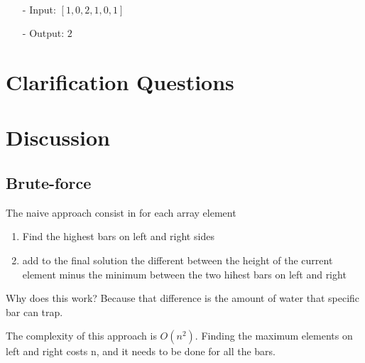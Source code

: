 \begin{example}
	\hfill \\
	\begin{itemize}
		\item[-] Input: $[1,0,2,1,0,1]  $
		\item[-] Output: $2$
	\end{itemize}
\end{example}

\section{Clarification Questions}

\begin{QandA}
	\item 
	\begin{answered}
		\textit{}
	\end{answered}
	
\end{QandA}

\section{Discussion}
\label{trapping_water:sec:discussion}


\subsection{Brute-force}
\label{trapping_water:sec:bruteforce}
The naive approach consist in for each array element

	\begin{enumerate}
		\item Find the highest bars on left and right sides
		\item add to the final solution the different between the height of the current element minus the minimum between the two hihest bars on left and right
	\end{enumerate}

Why does this work? Because that difference is the amount of water that specific bar can trap.

The complexity of this approach is $O(n^2)$. Finding the maximum elements on left and right costs n, and it needs to be done for all the bars.



